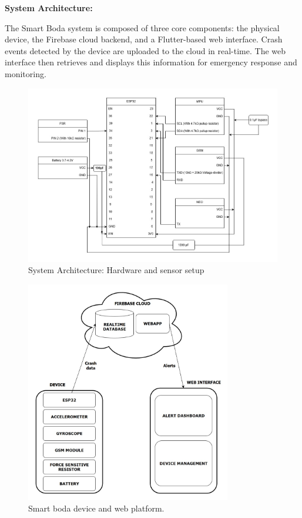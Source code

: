 \documentclass[12pt]{article}
\begin{document}
\textbf{System Architecture:}

The Smart Boda system is composed of three core components: the physical device, the Firebase cloud backend, and a Flutter-based web interface. Crash events detected by the device are uploaded to the cloud in real-time. The web interface then retrieves and displays this information for emergency response and monitoring.

\begin{figure}[H]
  \centering
  \includegraphics[width=\textwidth]{System Diagram.jpg}
  \caption{System Architecture: Hardware and sensor setup}
  \label{fig:architecture}
\end{figure}

\begin{figure}[H]
  \centering
  \includegraphics[width=0.8\textwidth]{PHOTO-2025-07-28-12-34-26.jpg}
  \caption{Smart boda device and web platform.}
  \label{fig:new_image}
\end{figure}
\end{document}
